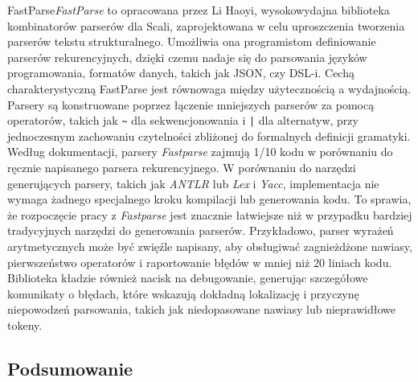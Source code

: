 FastParse\textit{FastParse}\cite{fastparse-docs} to opracowana przez Li Haoyi, wysokowydajna biblioteka kombinatorów parserów dla Scali, zaprojektowana w celu uproszczenia tworzenia parserów tekstu strukturalnego.
Umożliwia ona programistom definiowanie parserów rekurencyjnych, dzięki czemu nadaje się do parsowania języków programowania, formatów danych, takich jak JSON, czy DSL-i.
Cechą charakterystyczną FastParse jest równowaga między użytecznością a wydajnością.
Parsery są konstruowane poprzez łączenie mniejszych parserów za pomocą operatorów, takich jak \verb&~& dla sekwencjonowania i \verb&|& dla alternatyw, przy jednoczesnym zachowaniu czytelności zbliżonej do formalnych definicji gramatyki.
Według dokumentacji\cite{fastparse-docs}, parsery \textit{Fastparse} zajmują 1/10 kodu w porównaniu do ręcznie napisanego parsera rekurencyjnego.
W porównaniu do narzędzi generujących parsery, takich jak \textit{ANTLR} lub \textit{Lex} i \textit{Yacc}, implementacja nie wymaga żadnego specjalnego kroku kompilacji lub generowania kodu.
To sprawia, że rozpoczęcie pracy z \textit{Fastparse} jest znacznie łatwiejsze niż w przypadku bardziej tradycyjnych narzędzi do generowania parserów.
Przykładowo, parser wyrażeń arytmetycznych może być zwięźle napisany, aby obsługiwać zagnieżdżone nawiasy, pierwszeństwo operatorów i raportowanie błędów w mniej niż 20 liniach kodu\cite{fastparse-slides}.
Biblioteka kładzie również nacisk na debugowanie, generując szczegółowe komunikaty o błędach, które wskazują dokładną lokalizację i przyczynę niepowodzeń parsowania, takich jak niedopasowane nawiasy lub nieprawidłowe tokeny.

\subsection{Podsumowanie}
\label{subsec:podsumowanie}

